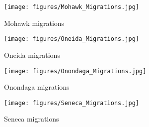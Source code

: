 \begin{figure}[ht]
\texttt{[image: figures/Mohawk\_Migrations.jpg]}
\caption{Mohawk migrations}
\label{map:Mohawk.migrations}
\end{figure}

\begin{figure}[ht]
\texttt{[image: figures/Oneida\_Migrations.jpg]}
\caption{Oneida migrations}
\label{map:Oneida.migrations}
\end{figure}

\begin{figure}[ht]
\texttt{[image: figures/Onondaga\_Migrations.jpg]}
\caption{Onondaga migrations}
\label{map:Onondaga.migrations}
\end{figure}

\begin{figure}[ht]
\texttt{[image: figures/Seneca\_Migrations.jpg]}
\caption{Seneca migrations}
\label{map:Seneca.migrations}
\end{figure}
